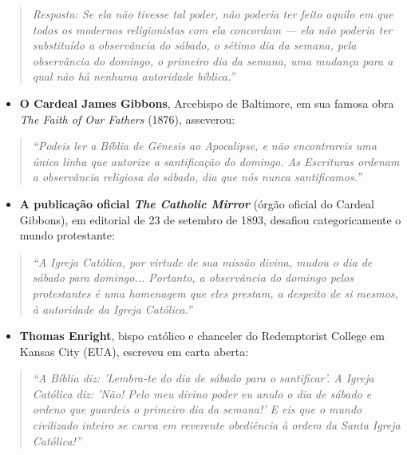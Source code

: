 \documentclass[11pt,a4paper,openany]{book}
\begin{document}
\begin{quote}
\itshape \textit{Resposta: Se ela não tivesse tal poder, não poderia ter feito aquilo em que todos os modernos religionistas com ela concordam — ela não poderia ter substituído a observância do sábado, o sétimo dia da semana, pela observância do domingo, o primeiro dia da semana, uma mudança para a qual não há nenhuma autoridade bíblica.''}
\end{quote}

\begin{itemize}
  \item \textbf{O Cardeal James Gibbons}, Arcebispo de Baltimore, em sua famosa obra \textit{The Faith of Our Fathers} (1876), asseverou:
\end{itemize}


\begin{quote}
\itshape \textit{``Podeis ler a Bíblia de Gênesis ao Apocalipse, e não encontrareis uma única linha que autorize a santificação do domingo. As Escrituras ordenam a observância religiosa do sábado, dia que nós nunca santificamos.''}
\end{quote}

\begin{itemize}
  \item \textbf{A publicação oficial \textit{The Catholic Mirror}} (órgão oficial do Cardeal Gibbons), em editorial de 23 de setembro de 1893, desafiou categoricamente o mundo protestante:
\end{itemize}


\begin{quote}
\itshape \textit{``A Igreja Católica, por virtude de sua missão divina, mudou o dia de sábado para domingo... Portanto, a observância do domingo pelos protestantes é uma homenagem que eles prestam, a despeito de si mesmos, à autoridade da Igreja Católica.''}
\end{quote}

\begin{itemize}
  \item \textbf{Thomas Enright}, bispo católico e chanceler do Redemptorist College em Kansas City (EUA), escreveu em carta aberta:
\end{itemize}


\begin{quote}
\itshape \textit{``A Bíblia diz: 'Lembra-te do dia de sábado para o santificar'. A Igreja Católica diz: 'Não! Pelo meu divino poder eu anulo o dia de sábado e ordeno que guardeis o primeiro dia da semana!' E eis que o mundo civilizado inteiro se curva em reverente obediência à ordem da Santa Igreja Católica!''}
\end{quote}
\end{document}
